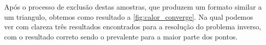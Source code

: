 Após o processo de exclusão destas amostras, que produzem um formato similar a um triangulo, obtemos como resultado a \autoref{fig:calor_converge}. Na qual podemos ver com clareza três resultados encontrados para a resolução do problema inverso, com o resultado correto sendo o prevalente para a maior parte dos pontos.


